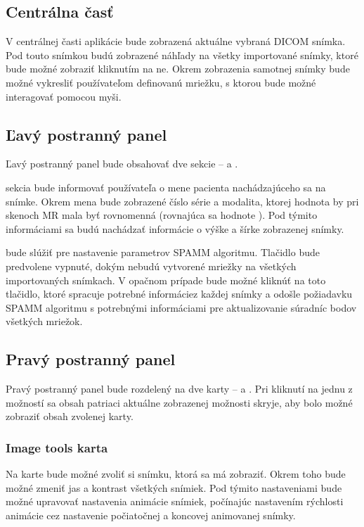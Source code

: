 \subsection {Centrálna časť}
V centrálnej časti aplikácie bude zobrazená aktuálne vybraná DICOM snímka. Pod touto snímkou budú zobrazené náhľady na všetky importované snímky, ktoré bude možné zobraziť kliknutím na ne. Okrem zobrazenia samotnej snímky bude možné vykresliť používateľom definovanú mriežku, s ktorou bude možné interagovať pomocou myši.

\subsection {Ľavý postranný panel}
Ľavý postranný panel bude obsahovať dve sekcie --  a .

 sekcia bude informovať používateľa o mene pacienta nachádzajúceho sa na snímke. Okrem mena bude zobrazené číslo série a modalita, ktorej hodnota by pri skenoch MR mala byť rovnomenná (rovnajúca sa hodnote ). Pod týmito informáciami sa budú nachádzať informácie o výške a šírke zobrazenej snímky.

 bude slúžiť pre nastavenie parametrov SPAMM algoritmu. Tlačidlo  bude predvolene vypnuté, dokým nebudú vytvorené mriežky na všetkých importovaných snímkach. V opačnom prípade bude možné kliknúť na toto tlačidlo, ktoré spracuje potrebné informácie\newline z každej snímky a odošle požiadavku SPAMM algoritmu s potrebnými informáciami pre aktualizovanie súradníc bodov všetkých mriežok.

\subsection {Pravý postranný panel}
Pravý postranný panel bude rozdelený na dve karty --  a . Pri kliknutí na jednu z možností sa obsah patriaci aktuálne zobrazenej možnosti skryje, aby bolo možné zobraziť obsah zvolenej karty.

\subsubsection {Image tools karta}
Na  karte bude možné zvoliť si snímku, ktorá sa má zobraziť. Okrem toho bude možné zmeniť jas a kontrast všetkých snímiek. Pod týmito nastaveniami bude možné upravovať nastavenia animácie snímiek, počínajúc nastavením rýchlosti animácie cez nastavenie počiatočnej a koncovej animovanej snímky.

